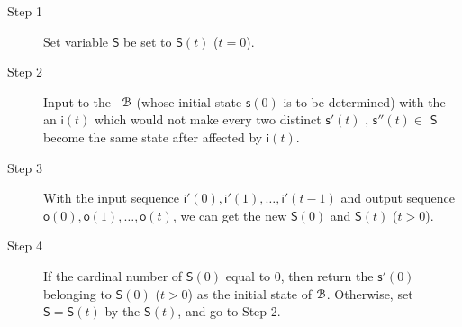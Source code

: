 

 
\begin{description}
	\item[Step 1]  Set variable $\mathsf{S}$ be set to $\mathsf{S}(t)$ ($t=0$).
	\item[Step 2] Input to the \BCN\ ${\mathcal{B}}$ (whose initial state $\mathsf{s}(0)$ is to be determined) with the an $\mathsf{i}(t)$ which would not make every two distinct $\mathsf{s}'(t)$ , $\mathsf{s}''(t)$$\in$ $\mathsf{S}$ become the same state after affected by $\mathsf{i}(t)$. 
	\item[Step 3] With the input sequence $\mathsf{i}'(0),\mathsf{i}'(1),\ldots, \mathsf{i}'(t-1)$ and output sequence $\mathsf{o}(0),\mathsf{o}(1),\ldots,\mathsf{o}(t)$, we can get the new $\mathsf{S}(0)$ and $\mathsf{S}(t)$ ($t>0$).
	\item[Step 4] If the cardinal number of $\mathsf{S}(0)$ equal to $0$, then return the $\mathsf{s}'(0)$ belonging to $\mathsf{S}(0)$ ($t>0$) as the initial state of ${\mathcal{B}}$. Otherwise, set $\mathsf{S}=\mathsf{S}(t)$ by the $\mathsf{S}(t)$, and go to Step 2.
\end{description}

